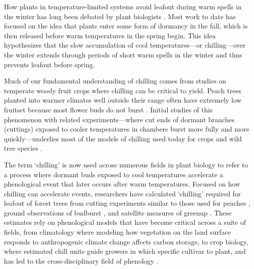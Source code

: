 \documentclass[11pt]{article}
\begin{document}
How plants in temperature-limited systems avoid leafout during warm spells in the winter has long been debated by plant biologists \citep[e.g.,][]{lamb1948effect,weinberger}. Most work to date has focused on the idea that plants enter some form of dormancy in the fall, which is then released before warm temperatures in the spring begin. This idea hypothesizes that the slow accumulation of cool temperatures---or chilling---over the winter extends through periods of short warm spells in the winter and thus prevents leafout before spring. 

Much of our fundamental understanding of chilling comes from studies on temperate woody fruit crops where chilling can be critical to yield. Peach trees planted into warmer climates well outside their range often have extremely low fruitset because most flower buds do not burst \citep{weinberger,overcash1955effects,erez1971improved}. Initial studies of this phenomenon with related experiments---where cut ends of dormant branches (cuttings) exposed to cooler temperatures in chambers burst more fully and more quickly---underlies most of the models of chilling used today for crops and wild tree species \citep[][]{weinberger,ospreebbms}. %

The term `chilling' is now used across numerous fields in plant biology to refer to a process where dormant buds exposed to cool temperatures accelerate a phenological event that later occurs after warm temperatures. Focused on how chilling can accelerate events, researchers have calculated `chilling' required for leafout of forest trees from cutting experiments similar to those used for peaches \citep[reviewed in][]{ospreebbms}, ground observations of budburst \citep{Luedeling2009}, and satellite measures of greenup \citep{kaduk2011predicting}. These estimates rely on phenological models that have become critical across a suite of fields, from climatology where modeling how vegetation on the land surface responds to anthropogenic climate change affects carbon storage, to crop biology, where estimated chill units guide growers in which specific cultivar to plant, and has led to the cross-disciplinary field of phenology \citep{Schwartz:1994he,Cleland:2007or,pmp}. %
\end{document}

